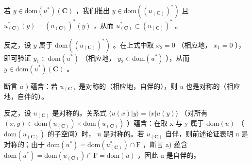 若 \(y \in \text{dom}(u^*)(\mathbf{C})\) ，我们推出 \(y \in \text{dom}((u_{(\mathbf{C})})^*)\) 且 \(u_{(\mathbf{C})}^*(y) = (u_{(\mathbf{C})})^*(y)\) ，从而 \(u_{(\mathbf{C})}^* \subset (u_{(\mathbf{C})})^*\) 。

反之，设 \(y\) 属于 \(\text{dom}((u_{(\mathbf{C})})^*)\) 。在上式中取 \(x_2 = 0\) （相应地， \(x_1 = 0\) ），即可验证 \(y_1 \in \text{dom}(u^*)\) （相应地， \(y_2 \in \text{dom}(u^*)\) ），从而 \(y \in \text{dom}(u^*)(\mathbf{C})\) 。

断言 \(a\) ) 蕴含：若 \(u_{(\mathbf{C})}\) 是对称的（相应地，自伴的），则 \(u\) 也是对称的（相应地，自伴的）。

反之，设 \(u_{(\mathbf{C})}\) 是对称的。关系式 \(\langle u(x)|y\rangle = \langle x|u(y)\rangle\) （对所有 \((x,y) \in \mathrm{dom}(u_{(\mathbf{C})}) \times \mathrm{dom}(u_{(\mathbf{C})})\) ）蕴含：在取 x 与 y 属于 \(\mathrm{dom}(u)\) （ \(\mathrm{dom}(u_{(\mathbf{C})})\) 的子空间）时， u 是对称的。若 \(u_{(\mathbf{C})}\) 自伴，则前述论证表明 u 是对称的；由于 \(\mathrm{dom}(u^{*}) = \mathrm{dom}(u_{(\mathbf{C})}^{*}) \cap \mathrm{F}\) ，断言 a) 蕴含 \(\mathrm{dom}(u^{*}) = \mathrm{dom}(u_{(\mathbf{C})}) \cap \mathrm{F} = \mathrm{dom}(u)\) ，因此 u 是自伴的。

